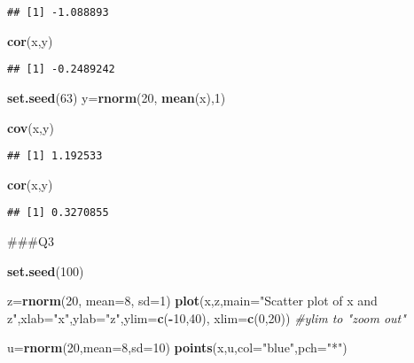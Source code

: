 \documentclass[]{article}
\newenvironment{Shaded}{\begin{snugshade}}{\end{snugshade}}
\newcommand{\CommentTok}[1]{\textcolor[rgb]{0.56,0.35,0.01}{\textit{#1}}}
\newcommand{\DataTypeTok}[1]{\textcolor[rgb]{0.13,0.29,0.53}{#1}}
\newcommand{\DecValTok}[1]{\textcolor[rgb]{0.00,0.00,0.81}{#1}}
\newcommand{\KeywordTok}[1]{\textcolor[rgb]{0.13,0.29,0.53}{\textbf{#1}}}
\newcommand{\NormalTok}[1]{#1}
\newcommand{\OperatorTok}[1]{\textcolor[rgb]{0.81,0.36,0.00}{\textbf{#1}}}
\newcommand{\StringTok}[1]{\textcolor[rgb]{0.31,0.60,0.02}{#1}}
\begin{document}
\begin{verbatim}
## [1] -1.088893
\end{verbatim}

\begin{Shaded}
\begin{Highlighting}[]
\KeywordTok{cor}\NormalTok{(x,y)}
\end{Highlighting}
\end{Shaded}

\begin{verbatim}
## [1] -0.2489242
\end{verbatim}

\begin{Shaded}
\begin{Highlighting}[]
\KeywordTok{set.seed}\NormalTok{(}\DecValTok{63}\NormalTok{)}
\NormalTok{y=}\KeywordTok{rnorm}\NormalTok{(}\DecValTok{20}\NormalTok{, }\KeywordTok{mean}\NormalTok{(x),}\DecValTok{1}\NormalTok{)}

\KeywordTok{cov}\NormalTok{(x,y)}
\end{Highlighting}
\end{Shaded}

\begin{verbatim}
## [1] 1.192533
\end{verbatim}

\begin{Shaded}
\begin{Highlighting}[]
\KeywordTok{cor}\NormalTok{(x,y)}
\end{Highlighting}
\end{Shaded}

\begin{verbatim}
## [1] 0.3270855
\end{verbatim}

\#\#\#Q3

\begin{Shaded}
\begin{Highlighting}[]
\KeywordTok{set.seed}\NormalTok{(}\DecValTok{100}\NormalTok{)}

\NormalTok{z=}\KeywordTok{rnorm}\NormalTok{(}\DecValTok{20}\NormalTok{, }\DataTypeTok{mean=}\DecValTok{8}\NormalTok{, }\DataTypeTok{sd=}\DecValTok{1}\NormalTok{)}
\KeywordTok{plot}\NormalTok{(x,z,}\DataTypeTok{main=}\StringTok{"Scatter plot of x and z"}\NormalTok{,}\DataTypeTok{xlab=}\StringTok{"x"}\NormalTok{,}\DataTypeTok{ylab=}\StringTok{"z"}\NormalTok{,}\DataTypeTok{ylim=}\KeywordTok{c}\NormalTok{(}\OperatorTok{-}\DecValTok{10}\NormalTok{,}\DecValTok{40}\NormalTok{), }\DataTypeTok{xlim=}\KeywordTok{c}\NormalTok{(}\DecValTok{0}\NormalTok{,}\DecValTok{20}\NormalTok{)) }\CommentTok{#ylim to "zoom out"}

\NormalTok{u=}\KeywordTok{rnorm}\NormalTok{(}\DecValTok{20}\NormalTok{,}\DataTypeTok{mean=}\DecValTok{8}\NormalTok{,}\DataTypeTok{sd=}\DecValTok{10}\NormalTok{)}
\KeywordTok{points}\NormalTok{(x,u,}\DataTypeTok{col=}\StringTok{"blue"}\NormalTok{,}\DataTypeTok{pch=}\StringTok{"*"}\NormalTok{)}
\end{Highlighting}
\end{Shaded}
\end{document}

